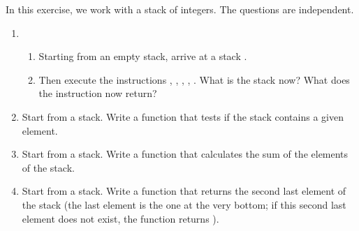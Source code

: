 \documentclass[11pt,class=report,crop=false]{standalone}
\begin{document}
\begin{activite}


In this exercise, we work with a stack of integers. The questions are independent.

\begin{enumerate}
  \item 
  \begin{enumerate}
    \item Starting from an empty stack, arrive at a stack \ci{[5,7,2,4]}.
    \item Then execute the instructions , , , , . What is the stack now? What does the instruction   now return?
\end{enumerate}  

  \item Start from a stack. Write a function  that tests if the stack contains a given element.
  
  \item Start from a stack. Write a function that calculates the sum of the elements of the stack. 
  
  \item Start from a stack. Write a function that returns the second last element of the stack (the last element is the one at the very bottom; if this second last element does not exist, the function returns ). 
  
\end{enumerate} 
\end{activite}

\end{document}
